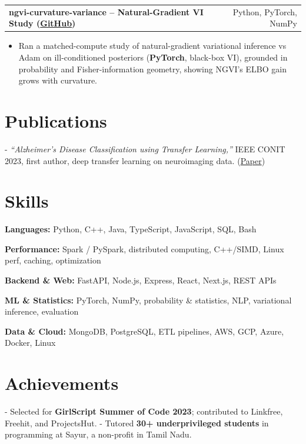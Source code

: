 \documentclass[letterpaper,11pt]{article}
\makeatletter
\newcommand{\projItem}[2]{%
  \vspace{6pt}
  \begin{tabular*}{\textwidth}{@{}l@{\extracolsep{\fill}}r@{}}
    \textbf{#1} & #2 \\
  \end{tabular*}\par\vspace{-2pt}
}
\newcommand{\skillLine}[2]{\textbf{#1:} #2\par\vspace{2pt}}
\newcommand{\inlineBlock}[1]{{\setlength{\leftskip}{0.18in}\small #1\par}}
\makeatother
\begin{document}
\projItem{ngvi-curvature-variance -- Natural-Gradient VI Study {\normalfont\small(\href{https://github.com/Deva-1903/ngvi-curvature-variance}{GitHub})}}{Python, PyTorch, NumPy}
\begin{itemize}
  \item Ran a matched-compute study of natural-gradient variational inference vs Adam on ill-conditioned posteriors (\textbf{PyTorch}, black-box VI), grounded in probability and Fisher-information geometry, showing NGVI's ELBO gain grows with curvature.
\end{itemize}

\section{Publications}
\inlineBlock{- \textit{``Alzheimer's Disease Classification using Transfer Learning,''} IEEE CONIT 2023, first author, deep transfer learning on neuroimaging data. {\normalfont\small(\href{https://ieeexplore.ieee.org/document/10205760}{Paper})}}

\section{Skills}
\skillLine{Languages}{Python, C++, Java, TypeScript, JavaScript, SQL, Bash}
\skillLine{Performance}{Spark / PySpark, distributed computing, C++/SIMD, Linux perf, caching, optimization}
\skillLine{Backend \& Web}{FastAPI, Node.js, Express, React, Next.js, REST APIs}
\skillLine{ML \& Statistics}{PyTorch, NumPy, probability \& statistics, NLP, variational inference, evaluation}
\skillLine{Data \& Cloud}{MongoDB, PostgreSQL, ETL pipelines, AWS, GCP, Azure, Docker, Linux}

\section{Achievements}
\inlineBlock{- Selected for \textbf{GirlScript Summer of Code 2023}; contributed to Linkfree, Freehit, and ProjectsHut. - Tutored \textbf{30+ underprivileged students} in programming at Sayur, a non-profit in Tamil Nadu.}
\end{document}
